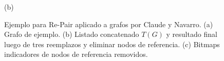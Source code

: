 \begin{frame}
\begin{figure}
\begin{minipage}{1\textwidth}
		\vspace{5mm}
		
		(b)
    	\end{minipage}

    \caption{Ejemplo para Re-Pair aplicado a grafos por Claude y Navarro. (a) Grafo de ejemplo. (b) Listado concatenado $T(G)$ y resultado final luego de tres reemplazos y eliminar nodos de referencia. (c) Bitmaps indicadores de nodos de referencia removidos.}
\end{figure}

\end{frame}

